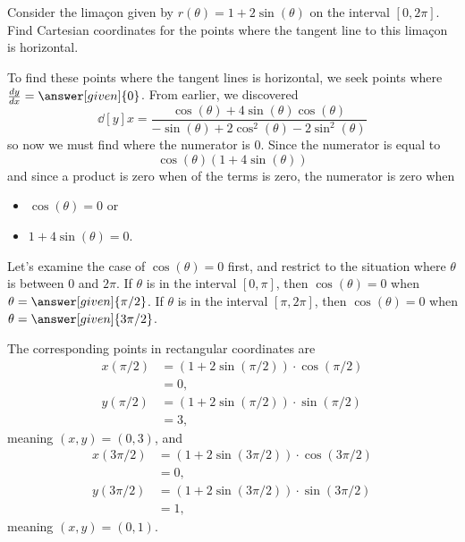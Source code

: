 \documentclass{ximera}
\begin{document}
\begin{example}
  Consider the lima\c{c}on given by $r(\theta) =1+2\sin(\theta)$ on the
  interval $[0,2\pi]$.  Find Cartesian coordinates for the points
  where the tangent line to this lima\c{c}on is horizontal.
\begin{explanation}
  To find these points where the tangent lines is horizontal, we seek
  points where $\dd[y]{x} = \answer[given]{0}$.  From earlier, we discovered
  \[
  \dd[y]{x} =\frac{\cos(\theta) + 4\sin(\theta)\cos(\theta)}{-\sin(\theta) + 2\cos^2(\theta)-2\sin^2(\theta)}
  \]
  so now we must find where the numerator is $0$. Since the numerator is equal to
  \[
  \cos(\theta)(1+ 4\sin(\theta))
  \]
  and since a product is zero when  of the terms is zero,
  the numerator is zero when 
  \begin{itemize}
  \item $\cos(\theta)=0$ or
  \item $1+4\sin(\theta)=0$.
  \end{itemize}

  Let's examine the case of $\cos(\theta) = 0$ first, and restrict to the situation where $\theta$ is between $0$ and $2\pi$.
  If $\theta$ is in the interval $[0,\pi]$, then $\cos(\theta)=0$ when $\theta=\answer[given]{\pi/2}$.
  If $\theta$ is in the interval $[\pi,2\pi]$, then $\cos(\theta)=0$ when $\theta=\answer[given]{3\pi/2}$.

  The corresponding points in rectangular coordinates are
  \begin{align*}
    x(\pi/2) &= \left(1+2\sin(\pi/2)\right)\cdot\cos(\pi/2)\\
    &= 0,\\
    y(\pi/2) &= \left(1+2\sin(\pi/2)\right)\cdot\sin(\pi/2)\\
    &= 3,
  \end{align*}
  meaning $(x,y) = (0,3)$, and
  \begin{align*}
    x(3\pi/2) &= \left(1+2\sin(3\pi/2)\right)\cdot\cos(3\pi/2)\\
    &= 0,\\
    y(3\pi/2) &= \left(1+2\sin(3\pi/2)\right)\cdot\sin(3\pi/2)\\
    &= 1,
  \end{align*}
  meaning $(x,y) = (0,1)$.


\end{explanation}
\end{example}
\end{document}
